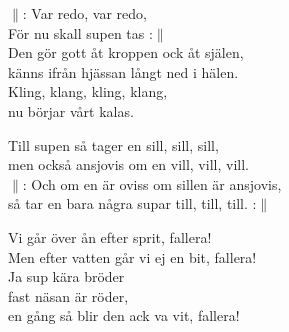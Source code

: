 \documentclass[a6paper, 10pt, twoside]{article}
\begin{document}
\noindent
\begin{center}
\end{center}
\begin{lyrics}
$\|$: Var redo, var redo, \\
För nu skall supen tas :$\|$\\
Den gör gott åt kroppen ock åt själen, \\
känns ifrån hjässan långt ned i hälen. \\
Kling, klang, kling, klang, \\
nu börjar vårt kalas. 
\end{lyrics}
\vspace{20pt}
\begin{center}
\end{center}
\begin{lyrics}
Till supen så tager en sill, sill, sill, \\
men också ansjovis om en vill, vill, vill. \\
$\|$: Och om en är oviss om sillen är ansjovis, \\
så tar en bara några supar till, till, till. :$\|$
\end{lyrics}
\vspace{20pt}
\begin{center}
\end{center}
\begin{lyrics}
Vi går över ån efter sprit, fallera!\\
Men efter vatten går vi ej en bit, fallera!\\
Ja sup kära bröder\\
fast näsan är röder,\\
en gång så blir den ack va vit, fallera!
\end{lyrics}
\end{document}
